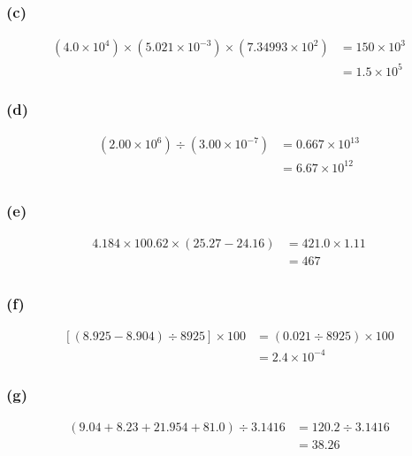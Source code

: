\documentclass[11pt]{scrartcl}
\begin{document}
\subsubsection{(c)}

\begin{align*}
    \left (4.0 \times 10^4 \right) \times \left (5.021 \times 10^{-3} \right) \times \left (7.34993 \times 10^{2} \right) &= 150 \times 10^{3} \\
    &= \boxed{1.5 \times 10^{5}}
\end{align*}

\subsubsection{(d)}

\begin{align*}
    \left (2.00 \times 10^{6} \right) \div \left (3.00 \times 10^{-7} \right) &= 0.667 \times 10^{13} \\
    &= \boxed{6.67 \times 10^{12}} \\
\end{align*}

\subsubsection{(e)}

\begin{align*}
    4.184 \times 100.62 \times \left(25.27 -24.16 \right) &= 421.0 \times 1.11 \\
    &= \boxed{467} \\
\end{align*}

\subsubsection{(f)}

\begin{align*}
    \left [ \left (8.925 - 8.904 \right) \div 8925 \right] \times 100 &= \left (0.021 \div 8925 \right) \times 100 \\
    &= \boxed{2.4 \times 10^{-4}}
\end{align*}

\subsubsection{(g)}

\begin{align*}
    \left (9.04 + 8.23 + 21.954 + 81.0 \right) \div 3.1416 &= 120.2 \div 3.1416 \\
    &= \boxed{38.26} \\
\end{align*}
\end{document}
